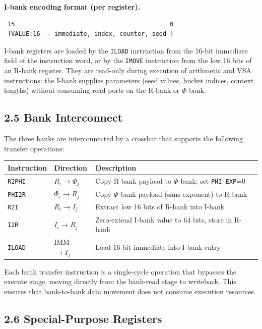 \textbf{I-bank encoding format (per register).}

\begin{verbatim}
 15                                           0
 [VALUE:16 -- immediate, index, counter, seed ]
\end{verbatim}

I-bank registers are loaded by the \texttt{ILOAD} instruction
from the 16-bit immediate field of the instruction word, or by
the \texttt{IMOVE} instruction from the low 16 bits of an
R-bank register. They are read-only during execution of
arithmetic and VSA instructions: the I-bank supplies parameters
(seed values, bucket indices, context lengths) without
consuming read ports on the R-bank or $\Phi$-bank.

\subsection{2.5 Bank Interconnect}\label{fa_71:bank-interconnect}

The three banks are interconnected by a crossbar that supports
the following transfer operations:

\begin{longtable}[]{@{}llp{7cm}@{}}
\toprule\noalign{}
Instruction & Direction & Description \\
\midrule\noalign{}
\endhead
\bottomrule\noalign{}
\endlastfoot
\texttt{R2PHI} & \(R_i \to \Phi_j\) & Copy R-bank payload to $\Phi$-bank; set \texttt{PHI\_EXP}=0 \\
\texttt{PHI2R} & \(\Phi_i \to R_j\) & Copy $\Phi$-bank payload (sans exponent) to R-bank \\
\texttt{R2I} & \(R_i \to I_j\) & Extract low 16 bits of R-bank into I-bank \\
\texttt{I2R} & \(I_i \to R_j\) & Zero-extend I-bank value to 64 bits, store in R-bank \\
\texttt{ILOAD} & IMM \(\to I_j\) & Load 16-bit immediate into I-bank entry \\
\end{longtable}

Each bank transfer instruction is a single-cycle operation that
bypasses the execute stage, moving directly from the bank-read
stage to writeback. This ensures that bank-to-bank data movement
does not consume execution resources.

\subsection{2.6 Special-Purpose Registers}\label{fa_71:spr}


